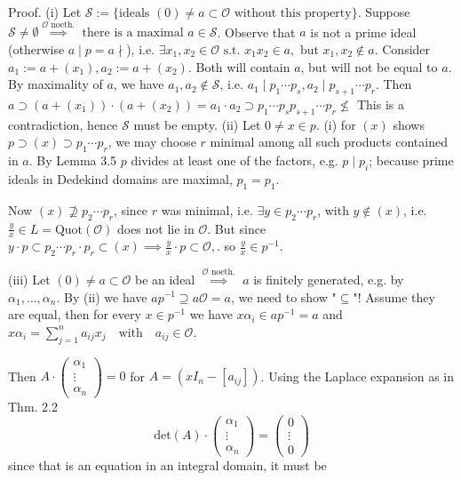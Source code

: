 Proof.
(i) Let \( \mathcal{S} := \{ \text{ideals } (0) \neq a \subset \mathcal{O} \text{ without this property} \} \).
Suppose \( \mathcal{S} \neq \emptyset \overset{\mathcal{O} \text{ noeth.}}{\implies} \text{ there is a maximal } a \in \mathcal{S} \).
Observe that \( a \) is not a prime ideal (otherwise \( a \mid p = a \nmid \)), i.e. \(\exists x_1, x_2 \in \mathcal{O} \text{ s.t. } x_1 x_2 \in a, \text{ but } x_1, x_2 \notin a \).
Consider \( a_1 := a + (x_1), a_2 := a + (x_2) \). Both will contain \( a \), but will not be equal to \( a \). By maximality of \( a \), we have \( a_1, a_2 \notin \mathcal{S} \), i.e. \( a_1 \mid p_1 \cdots p_s, a_2 \mid p_{s+1} \cdots p_r \). Then
\(
a \supset (a + (x_1)) \cdot (a + (x_2)) = a_1 \cdot a_2 \supset p_1 \cdots p_s p_{s+1} \cdots p_r \nleq
\)
This is a contradiction, hence \( \mathcal{S} \) must be empty.
(ii) Let \( 0 \neq x \in p \). (i) for \( (x) \) shows \( p \supset (x) \supset p_1 \cdots p_r \), we may choose \( r \) minimal among all such products contained in \( a \).
By Lemma 3.5 \( p \) divides at least one of the factors, e.g. \( p \mid p_i \); 
because prime ideals in Dedekind domains are maximal, \( p_1 = p_1 \).

Now \( (x) \not\supseteq p_2 \cdots p_r \), since \( r \) was minimal, i.e. \(\exists y \in p_2 \cdots p_r\), with \( y \notin (x) \), 
i.e. \(\frac{y}{x} \in L = \text{Quot}(\mathcal{O}) \) does not lie in \(\mathcal{O}\). But since
\( y \cdot p \subset p_2 \cdots p_r \cdot p_r \subset (x) \implies \frac{y}{x} \cdot p \subset \mathcal{O}, \).
so \(\frac{y}{x} \in p^{-1}\).

(iii) Let \( (0) \neq a \subset \mathcal{O} \) be an ideal \(\overset{\mathcal{O} \text{ noeth.}}{\implies}\) \( a \) is finitely generated, e.g. by \(\alpha_1, \ldots, \alpha_n\).
By (ii) we have \( ap^{-1} \supseteq a\mathcal{O} = a \), we need to show "\(\subseteq\)"!
Assume they are equal, then for every \( x \in p^{-1} \) we have \( x\alpha_i \in ap^{-1} = a \) and
\(
x \alpha_i = \sum_{j=1}^{n} a_{ij} x_j \quad \text{with} \quad a_{ij} \in \mathcal{O}.
\)

Then \( A \cdot \begin{pmatrix} \alpha_1 \\ \vdots \\ \alpha_n \end{pmatrix} = 0 \) for \( A = (xI_n - [a_{ij}]) \). Using the Laplace expansion as in Thm. 2.2
\[
\text{det}(A) \cdot \begin{pmatrix} \alpha_1 \\ \vdots \\ \alpha_n \end{pmatrix} = \begin{pmatrix} 0 \\ \vdots \\ 0 \end{pmatrix}
\]
since that is an equation in an integral domain, it must be

